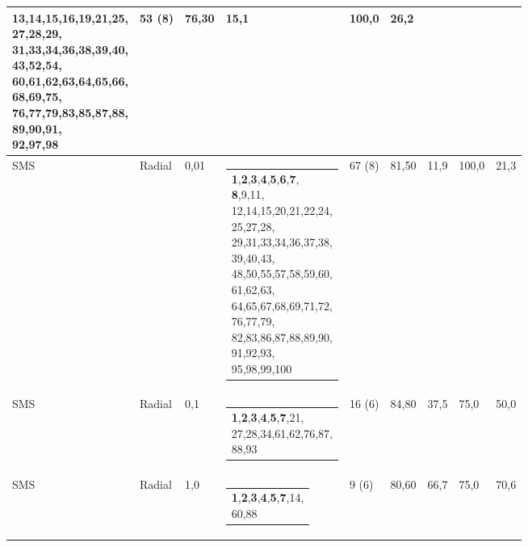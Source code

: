 \documentclass[
    12pt,
    a4paper,
    oneside,
    english,
    french,
    spanish,
    brazil
    ]{abntex2}
\makeatletter
\newcommand{\novo}[1]{\textcolor{corNova}{#1}}
\newcommand{\makecell}[2][t]{\begin{tabular}[#1]{@{}l@{}}#2\end{tabular}}
\makeatother
\begin{document}
\begin{longtable}{L{1.3cm}|L{1.3cm}|C{0.8cm}|L{4.8cm}|C{1.55cm}|C{0.95cm}|C{0.95cm}|C{0.9cm}|C{1.05cm}}
{{               13,14,15,16,19,21,25,\\
               27,28,29,\\
               31,33,34,36,38,39,40,\\
               43,52,54,\\
               60,61,62,63,64,65,66,\\
               68,69,75,\\
               76,77,79,83,85,87,88,\\
               89,90,91,\\
               92,97,98}} &
  \novo{53 (8)} & \novo{76,30} & \novo{15,1} & \novo{100,0} & \novo{26,2} \\
\hline
\novo{SMS} & \novo{Radial} & \novo{0,01} &
  \novo{\makecell[l]{\textbf{1},\textbf{2},\textbf{3},\textbf{4},\textbf{5},\textbf{6},\textbf{7},\\
               \textbf{8},9,11,\\
               12,14,15,20,21,22,24,\\
               25,27,28,\\
               29,31,33,34,36,37,38,\\
               39,40,43,\\
               48,50,55,57,58,59,60,\\
               61,62,63,\\
               64,65,67,68,69,71,72,\\
               76,77,79,\\
               82,83,86,87,88,89,90,\\
               91,92,93,\\
               95,98,99,100}} &
  \novo{67 (8)} & \novo{81,50} & \novo{11,9} & \novo{100,0} & \novo{21,3} \\
\hline
\novo{SMS} & \novo{Radial} & \novo{0,1} &
  \novo{\makecell[l]{\textbf{1},\textbf{2},\textbf{3},\textbf{4},\textbf{5},\textbf{7},21,\\
               27,28,34,61,62,76,87,\\
               88,93}} &
  \novo{16 (6)} & \novo{84,80} & \novo{37,5} & \novo{75,0} & \novo{50,0} \\
\hline
\novo{SMS} & \novo{Radial} & \novo{1,0} &
  \novo{\makecell[l]{\textbf{1},\textbf{2},\textbf{3},\textbf{4},\textbf{5},\textbf{7},14,\\
               60,88}} &
  \novo{9 (6)} & \novo{80,60} & \novo{66,7} & \novo{75,0} & \novo{70,6} \\
\hline

\end{longtable}
\end{document}
